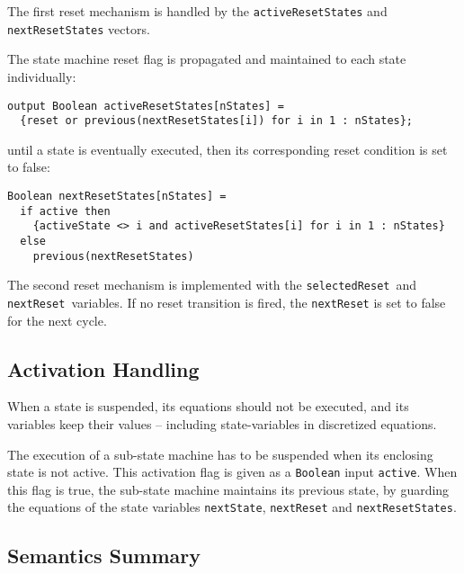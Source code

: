 The first reset mechanism is handled by the \lstinline!activeResetStates! and \lstinline!nextResetStates! vectors.

The state machine reset flag is propagated and maintained to each state individually:
\begin{lstlisting}[language=modelica]
output Boolean activeResetStates[nStates] =
  {reset or previous(nextResetStates[i]) for i in 1 : nStates};
\end{lstlisting}
until a state is eventually executed, then its corresponding reset condition is set to false:
\begin{lstlisting}[language=modelica]
Boolean nextResetStates[nStates] =
  if active then
    {activeState <> i and activeResetStates[i] for i in 1 : nStates}
  else
    previous(nextResetStates)
\end{lstlisting}
The second reset mechanism is implemented with the \lstinline!selectedReset!~and \lstinline!nextReset!~variables.
If no reset transition is fired, the \lstinline!nextReset! is set to false for the next cycle.

\subsection{Activation Handling}\label{activation-handling}

When a state is suspended, its equations should not be executed, and its variables keep their values -- including state-variables in discretized equations.

The execution of a sub-state machine has to be suspended when its enclosing state is not active.
This activation flag is given as a \lstinline!Boolean! input \lstinline!active!.
When this flag is true, the sub-state machine maintains its previous state, by guarding the equations of the state variables \lstinline!nextState!, \lstinline!nextReset! and \lstinline!nextResetStates!.

\subsection{Semantics Summary}\label{semantics-summary}

